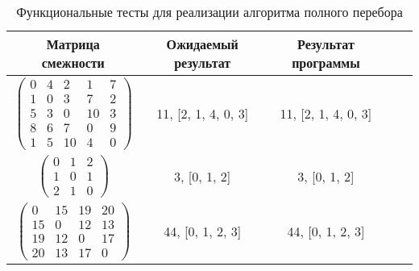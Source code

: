\begin{center}
	\captionsetup{justification=raggedright,singlelinecheck=off}
	\begin{longtable}[c]{|c|c|c|c|c|}
		\caption{Функциональные тесты для реализации алгоритма полного перебора\label{tbl:functional_test}} \\ \hline
		Матрица смежности & Ожидаемый результат & Результат программы \\
		\hline
		$ \begin{pmatrix}
			0 &  4 &  2 &  1 & 7 \\
			1 &  0 &  3 &  7 & 2 \\
			5 &  3 &  0 & 10 & 3 \\
			8 &  6 & 7 &  0 & 9 \\
			1 &  5 &  10 &  4 & 0
		\end{pmatrix}$ &
		11, [2, 1, 4, 0, 3] &
		11, [2, 1, 4, 0, 3] \\
		
		$ \begin{pmatrix}
			0 & 1 & 2 \\
			1 & 0 & 1 \\
			2 & 1 & 0
		\end{pmatrix}$ &
		3, [0, 1, 2] &
		3, [0, 1, 2] \\
		
		$ \begin{pmatrix}
			0 & 15 & 19 & 20 \\
			15 &  0 & 12 & 13 \\
			19 & 12 &  0 & 17 \\
			20 & 13 & 17 &  0
		\end{pmatrix}$ &
		44, [0, 1, 2, 3] &
		44, [0, 1, 2, 3] \\
		\hline
	\end{longtable}
\end{center}

\clearpage

